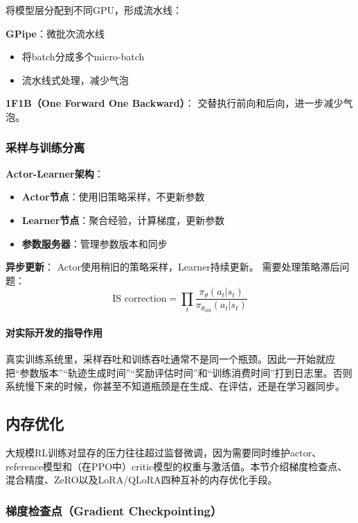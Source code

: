 \documentclass[12pt,a4paper]{article}
\begin{document}
将模型层分配到不同GPU，形成流水线：

\textbf{GPipe}：微批次流水线
\begin{itemize}
    \item 将batch分成多个micro-batch
    \item 流水线式处理，减少气泡
\end{itemize}

\textbf{1F1B（One Forward One Backward）}：
交替执行前向和后向，进一步减少气泡。

\subsubsection{采样与训练分离}

\textbf{Actor-Learner架构}：
\begin{itemize}
    \item \textbf{Actor节点}：使用旧策略采样，不更新参数
    \item \textbf{Learner节点}：聚合经验，计算梯度，更新参数
    \item \textbf{参数服务器}：管理参数版本和同步
\end{itemize}

\textbf{异步更新}：
Actor使用稍旧的策略采样，Learner持续更新。
需要处理策略滞后问题：
\begin{equation}
\text{IS correction} = \prod_{t} \frac{\pi_\theta(a_t|s_t)}{\pi_{\theta_{old}}(a_t|s_t)}
\end{equation}
\paragraph{对实际开发的指导作用}

真实训练系统里，采样吞吐和训练吞吐通常不是同一个瓶颈。因此一开始就应把“参数版本”“轨迹生成时间”“奖励评估时间”和“训练消费时间”打到日志里。否则系统慢下来的时候，你甚至不知道瓶颈是在生成、在评估，还是在学习器同步。

\subsection{内存优化}

大规模RL训练对显存的压力往往超过监督微调，因为需要同时维护actor、reference模型和（在PPO中）critic模型的权重与激活值。本节介绍梯度检查点、混合精度、ZeRO以及LoRA/QLoRA四种互补的内存优化手段。

\subsubsection{梯度检查点（Gradient Checkpointing）}
\end{document}
